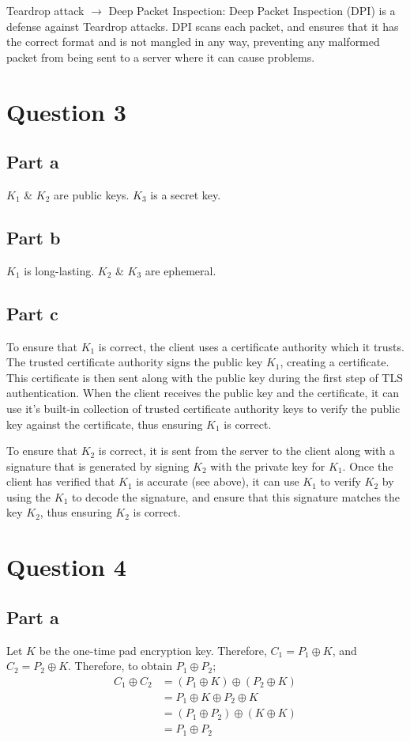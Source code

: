 \documentclass[12pt,a4paper]{article}
\begin{document}
Teardrop attack \(\rightarrow\) Deep Packet Inspection: Deep Packet Inspection (DPI) is a defense against Teardrop attacks. DPI scans each packet, and ensures that it has the correct format and is not mangled in any way, preventing any malformed packet from being sent to a server where it can cause problems.

\section{Question 3}
\subsection{Part a}
\(K_1\) \& \(K_2\) are public keys.
\(K_3\) is a secret key.

\subsection{Part b}
\(K_1\) is long-lasting.
\(K_2\) \& \(K_3\) are ephemeral.

\subsection{Part c}
To ensure that \(K_1\) is correct, the client uses a certificate authority which it trusts. The trusted certificate authority signs the public key \(K_1\), creating a certificate. This certificate is then sent along with the public key during the first step of TLS authentication. When the client receives the public key and the certificate, it can use it's built-in collection of trusted certificate authority keys to verify the public key against the certificate, thus ensuring \(K_1\) is correct.

To ensure that \(K_2\) is correct, it is sent from the server to the client along with a signature that is generated by signing \(K_2\) with the private key for \(K_1\). Once the client has verified that \(K_1\) is accurate (see above), it can use \(K_1\) to verify \(K_2\) by using the \(K_1\) to decode the signature, and ensure that this signature matches the key \(K_2\), thus ensuring \(K_2\) is correct.

\section{Question 4}
\subsection{Part a}
Let \(K\) be the one-time pad encryption key. Therefore, \(C_1 = P_1 \oplus K\), and \(C_2 = P_2 \oplus K\).
Therefore, to obtain \(P_1 \oplus P_2\);
\begin{align*}
  C_1 \oplus C_2 &= (P_1 \oplus K) \oplus (P_2 \oplus K)\\
  &= P_1 \oplus K \oplus P_2 \oplus K\\
  &= (P_1 \oplus P_2) \oplus (K \oplus K)\\
  &= P_1 \oplus P_2
\end{align*}
\end{document}
